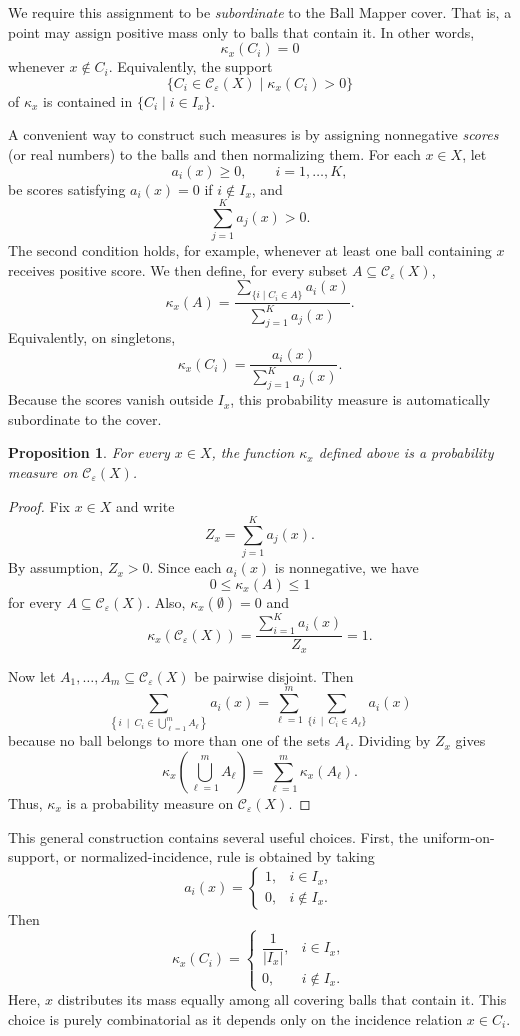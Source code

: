 \documentclass[9pt,a4paper,twocolumn,twoside]{extarticle}
\newtheorem{proposition}[theorem]{Proposition}
\theoremstyle{definition}
\begin{document}
We require this assignment to be \emph{subordinate} to the Ball Mapper cover. That is, a point may assign positive mass only to balls that contain it. In other words,
\[
\kappa_x({C_i})=0
\]
whenever $x \notin C_i$. Equivalently, the support 
\[
\{C_i\in\mathcal C_\varepsilon(X) \mid \kappa_x({C_i})>0\}
\]
of $\kappa_x$ is contained in $\{C_i \mid i\in I_x\}$.

A convenient way to construct such measures is by assigning nonnegative \emph{scores} (or real numbers) to the balls and then normalizing them. For each $x\in X$, let
\[
a_i(x) \ge 0, \qquad i=1,\dots,K,
\]
be scores satisfying $a_i(x)=0$ if $i \notin I_x$, and
\[
\sum_{j=1}^K a_j(x) > 0.
\]
The second condition holds, for example, whenever at least one ball containing $x$ receives positive score. We then define, for every subset $A\subseteq \mathcal C_\varepsilon(X)$,
\[
\kappa_x(A) = \frac{\sum_{\{i \mid C_i\in A\}} a_i(x)}{\sum_{j=1}^K a_j(x)}.
\]
Equivalently, on singletons,
\[
\kappa_x({C_i}) = \frac{a_i(x)}{\sum_{j=1}^K a_j(x)}.
\]
Because the scores vanish outside $I_x$, this probability measure is automatically subordinate to the cover.

\begin{proposition}
For every $x\in X$, the function $\kappa_x$ defined above is a probability measure on $\mathcal C_\varepsilon(X)$.
\end{proposition}

\begin{proof}
Fix $x\in X$ and write
\[
Z_x=\sum_{j=1}^K a_j(x).
\]
By assumption, $Z_x > 0$. Since each $a_i(x)$ is nonnegative, we have
\[
0\le \kappa_x(A)\le 1
\]
for every $A\subseteq\mathcal C_\varepsilon(X)$. Also, $\kappa_x(\emptyset)=0$ and
\[
\kappa_x(\mathcal C_\varepsilon(X)) = \frac{\sum_{i=1}^K a_i(x)}{Z_x} = 1.
\]

Now let $A_1,\dots,A_m\subseteq \mathcal C_\varepsilon(X)$ be pairwise disjoint. Then
\[
\sum_{\left\{i \ \mid \ C_i\in \bigcup_{\ell=1}^m A_\ell\right\}} a_i(x) =\sum_{\ell=1}^m \sum_{\{i \ \mid \ C_i\in A_\ell\}} a_i(x)
\]
because no ball belongs to more than one of the sets $A_\ell$. Dividing by $Z_x$ gives
\[
\kappa_x\left(\bigcup_{\ell=1}^m A_\ell\right) = \sum_{\ell=1}^m \kappa_x(A_\ell).
\]
Thus, $\kappa_x$ is a probability measure on $\mathcal C_\varepsilon(X)$.
\end{proof}

This general construction contains several useful choices. First, the uniform-on-support, or normalized-incidence, rule is obtained by taking
\[
a_i(x)=
\begin{cases}
1, & i\in I_x,\\
0, & i\notin I_x.
\end{cases}
\]
Then
\[
\kappa_x({C_i}) =
\begin{cases}
\dfrac{1}{|I_x|}, & i\in I_x,\\[0.5em] 
0, & i\notin I_x.
\end{cases}
\]
Here, $x$ distributes its mass equally among all covering balls that contain it. This choice is purely combinatorial as it depends only on the incidence relation $x \in C_i$.
\end{document}
